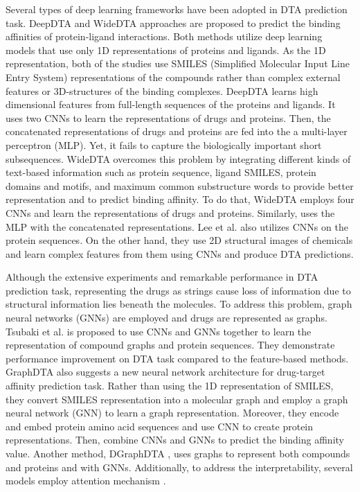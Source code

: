 Several types of deep learning frameworks have been adopted in DTA prediction task. DeepDTA \cite{ozturk2018deepdta} and WideDTA \cite{ozturk2019widedta} approaches are proposed to predict the binding affinities of protein-ligand interactions. Both methods utilize deep learning models that use only 1D representations of proteins and ligands. As the 1D representation, both of the studies use SMILES (Simplified Molecular Input Line Entry System) representations of the compounds rather than complex external features or 3D-structures of the binding complexes. DeepDTA learns high dimensional features from full-length sequences of the proteins and ligands. It uses two CNNs to learn the representations of drugs and proteins. Then, the concatenated representations of drugs and proteins are fed into the a multi-layer perceptron (MLP). Yet, it fails to capture the biologically important short subsequences. WideDTA overcomes this problem by integrating different kinds of text-based information such as protein sequence, ligand SMILES, protein domains and motifs, and maximum common substructure words to provide better representation and to predict binding affinity. To do that, WideDTA employs four CNNs and learn the representations of drugs and proteins. Similarly, uses the MLP with the concatenated representations. Lee et al. \cite{lee2019deepconv} also utilizes CNNs on the protein sequences. On the other hand, they use 2D structural images of chemicals and learn complex features from them using CNNs and produce DTA predictions.

Although the extensive experiments and remarkable performance in DTA prediction task, representing the drugs as strings cause loss of information due to structural information lies beneath the molecules. To address this problem, graph neural networks (GNNs) are employed and drugs are represented as graphs. Tsubaki et al. \cite{tsubaki2019compound} is proposed to use CNNs and GNNs together to learn the representation of compound graphs and protein sequences. They demonstrate performance improvement on DTA task compared to the feature-based methods. GraphDTA \cite{nguyen2019graphdta} also suggests a new neural network architecture for drug-target affinity prediction task. Rather than using the 1D representation of SMILES, they convert SMILES representation into a molecular graph and employ a graph neural network (GNN) to learn a graph representation. Moreover, they encode and embed protein amino acid sequences and use CNN to create protein representations. Then, combine CNNs and GNNs to predict the binding affinity value. Another method, DGraphDTA \cite{jiang2020drug}, uses graphs to represent both compounds and proteins and with GNNs. Additionally, to address the interpretability, several models employ attention mechanism \cite{karimi2020explainable, chen2020transformercpi, agyemang2020multi, yang2021ml}. 

